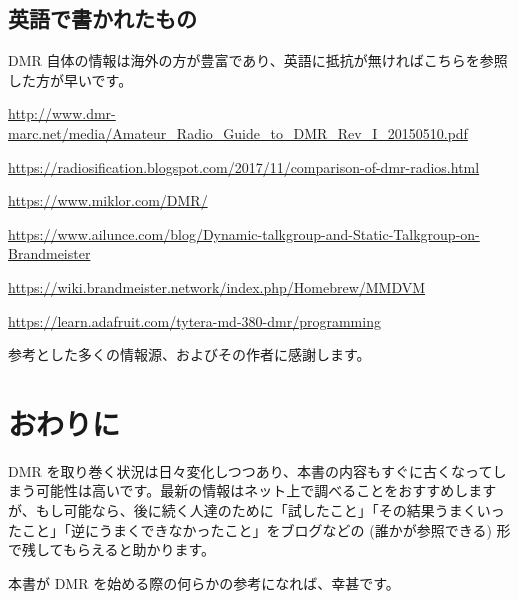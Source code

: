 \documentclass[a4j,oneside]{ujbook}
\begin{document}
\section{英語で書かれたもの}

DMR 自体の情報は海外の方が豊富であり、英語に抵抗が無ければこちらを参照した方が早いです。

\begin{description}[style=nextline]
 \item[Amateur Radio Guide to Digital Mobile Radio (DMR) (DMR-MARC)] \url{http://www.dmr-marc.net/media/Amateur_Radio_Guide_to_DMR_Rev_I_20150510.pdf}
 \item[Comparison of DMR radios (Radiosification)] \url{https://radiosification.blogspot.com/2017/11/comparison-of-dmr-radios.html}
 \item[DMR Info Site (K3NXU)] \url{https://www.miklor.com/DMR/}
 \item[Dynamic talkgroup and Static Talkgroup on Brandmeister (Ailunce)] \url{https://www.ailunce.com/blog/Dynamic-talkgroup-and-Static-Talkgroup-on-Brandmeister}
 \item[Homebrew/MMDVM (BrandMeister)] \url{https://wiki.brandmeister.network/index.php/Homebrew/MMDVM}
 \item[You and Your Tytera MD-380 DMR (Adafruit)] \url{https://learn.adafruit.com/tytera-md-380-dmr/programming}
\end{description}

参考とした多くの情報源、およびその作者に感謝します。

\chapter{おわりに}

DMR を取り巻く状況は日々変化しつつあり、本書の内容もすぐに古くなってしまう可能性は高いです。最新の情報はネット上で調べることをおすすめしますが、もし可能なら、後に続く人達のために「試したこと」「その結果うまくいったこと」「逆にうまくできなかったこと」をブログなどの (誰かが参照できる) 形で残してもらえると助かります。

本書が DMR を始める際の何らかの参考になれば、幸甚です。
\end{document}
